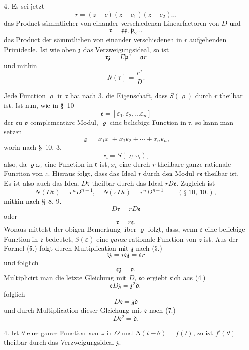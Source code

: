 \documentclass{article}
\begin{document}
4. Es sei jetzt
\[ r = (z-c)(z-c_{1})(z-c_{2})\ldots \]
das Product sämmtlicher von einander verschiedenen Linearfactoren von $D$ und
\[ \mathfrak{r} = \mathfrak{p}\mathfrak{p}_{1}\mathfrak{p}_{2}\ldots \]
das Product der sämmtlichen von einander verschiedenen in $r$ aufgehenden Primideale. Ist wie oben $\mathfrak{z}$ das Verzweigungsideal, so ist
\[ \mathfrak{r}\mathfrak{z} = \Pi\mathfrak{p}^{e} = \mathfrak{o}r \tag{5.} \]
und mithin
\[ N(\mathfrak{r}) = \frac{r^{n}}{D}. \]

Jede Function $\varrho$ in $\mathfrak{r}$ hat nach 3. die Eigenschaft, dass $S(\varrho)$ durch $r$ theilbar ist. Ist nun, wie in §~10
\[ \mathfrak{e} = [\varepsilon_{1}, \varepsilon_{2}, \ldots \varepsilon_{n}] \]
der zu $\mathfrak{o}$ complementäre Modul, $\varrho$ eine beliebige Function in $\mathfrak{r}$, so kann man setzen
\[ \varrho = x_{1}\varepsilon_{1} + x_{2}\varepsilon_{2} + \cdots + x_{n}\varepsilon_{n}, \]
worin nach §~10, 3.
\[ x_{\iota} = S(\varrho\omega_{\iota}), \]
also, da $\varrho\omega_{\iota}$ eine Function in $\mathfrak{r}$ ist, $x_{\iota}$ eine durch $r$ theilbare ganze rationale Function von $z$. Hieraus folgt, dass das Ideal $\mathfrak{r}$ durch den Modul $r\mathfrak{e}$ theilbar ist. Es ist also auch das Ideal $D\mathfrak{r}$ theilbar durch das Ideal $rD\mathfrak{e}$. Zugleich ist
\[ N(D\mathfrak{r}) = r^{n}D^{n-1}, \quad N(rD\mathfrak{e}) = r^{n}D^{n-1} \qquad (\text{§~10, 10.}); \]
mithin nach §~8, 9.
\[ D\mathfrak{r} = rD\mathfrak{e} \]
oder
\[ \mathfrak{r} = r\mathfrak{e}. \tag{6.} \]
Woraus mittelst der obigen Bemerkung über $\varrho$ folgt, dass, wenn $\varepsilon$ eine beliebige Function in $\mathfrak{e}$ bedeutet, $S(\varepsilon)$ eine \emph{ganze} rationale Function von $z$ ist. Aus der Formel (6.) folgt durch Multiplication mit $\mathfrak{z}$ nach (5.)
\[ \mathfrak{r}\mathfrak{z} = r\mathfrak{e}\mathfrak{z} = \mathfrak{o}r \]
und folglich
\[ \mathfrak{e}\mathfrak{z} = \mathfrak{o}. \tag{7.} \]
Multiplicirt man die letzte Gleichung mit $D$, so ergiebt sich aus (4.)
\[ \mathfrak{e}D\mathfrak{z} = \mathfrak{z}^{2}\mathfrak{d}, \]
folglich
\[ D\mathfrak{e} = \mathfrak{z}\mathfrak{d} \tag{8.} \]
und durch Multiplication dieser Gleichung mit $\mathfrak{e}$ nach (7.)
\[ D\mathfrak{e}^{2} = \mathfrak{d}. \tag{9.} \]

4. Ist $\theta$ eine ganze Function von $z$ in $\Omega$ und $N(t-\theta) = f(t)$, so ist $f'(\theta)$ theilbar durch das Verzweigungsideal $\mathfrak{z}$.
\end{document}
